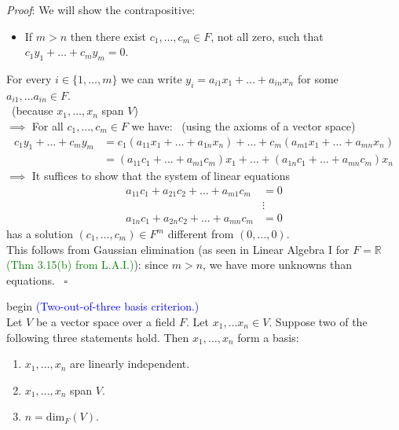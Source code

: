 \documentclass[
  12pt,
  a4paper,
  twoside]{article}
\providecommand{\tightlist}{%
  \setlength{\itemsep}{0pt}\setlength{\parskip}{0pt}}
\theoremstyle{plain}
\theoremstyle{definition}
\begin{document}
\emph{Proof}:
We will show the contrapositive:

\begin{itemize}
\tightlist
\item
  If \(m > n\) then there exist \(c_1, \dots, c_m \in F\), not all zero, such that \(c_1y_1 + \dots + c_my_m = 0\).
\end{itemize}

For every \(i \in \{1, \dots, m\}\) we can write \(y_{i} = a_{i1}x_1+ \dots +a_{in}x_n\) for some \(a_{i1}, \dots a_{in} \in F\).\\
\hspace*{0.333em}\hfill~{(because \(x_1, \dots, x_n\) span \(V\))}\\
\(\implies\) For all \(c_1, \dots, c_m \in F\) we have: \hfill~{(using the axioms of a vector space)}
\begin{align*}
c_1y_1 + \dots + c_my_m &= c_1(a_{11}x_1 + \dots + a_{1n}x_n) + \dots + c_{m}(a_{m1}x_1 + \dots + a_{mn}x_n)
\\ &= (a_{11}c_1 + \dots + a_{m1}c_m)x_1 + \dots + (a_{1n}c_1 + \dots + a_{mn}c_m)x_n
\end{align*}
\(\implies\) It suffices to show that the system of linear equations
\begin{align*}
a_{11}c_1 + a_{21}c_2 + \dots + a_{m1}c_m &= 0\\
&\vdots\\
a_{1n}c_1 + a_{2n}c_2 + \dots + a_{mn}c_m &= 0
\end{align*}
has a solution \((c_1, \dots, c_m) \in F^m\) different from \((0, \dots, 0)\).\\
This follows from Gaussian elimination (as seen in Linear Algebra I for \(F=\mathbb{R}\) \textcolor{green}{(Thm 3.15(b) from L.A.I.)}):
since \(m>n\), we have more unknowns than equations.
\hfill~{\(\square\)}

\csname begin\label{cnj:coro-two-out-of-three}
\textcolor{blue}{(Two-out-of-three basis criterion.)}\\
Let \(V\) be a vector space over a field \(F\).
Let \(x_1, \dots x_n \in V\). Suppose two of the following three statements hold.
Then \(x_1, \dots, x_n\) form a basis:

\begin{enumerate}
\def\labelenumi{(\alph{enumi})}
\tightlist
\item
  \(x_1, \dots, x_n\) are linearly independent.
\item
  \(x_1, \dots, x_n\) span \(V\).
\item
  \(n = \mathrm{dim}_{F}(V)\).
\end{enumerate}
\end{document}
